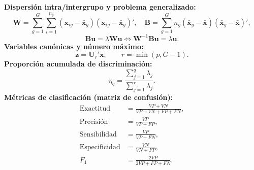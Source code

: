 \documentclass[12pt, a4paper]{article}
\theoremstyle{plain}
\theoremstyle{definition}
\theoremstyle{remark}
\newcommand{\mat}[1]{\mathbf{#1}}
\begin{document}
\begin{mdframed}[style=resultado]
\[\]
\textbf{Dispersión intra/intergrupo y problema generalizado:}
\[
  \mat{W}=\sum_{g=1}^{G}\sum_{i=1}^{n_g}(\mathbf{x}_{ig}-\bar{\mathbf{x}}_g)(\mathbf{x}_{ig}-\bar{\mathbf{x}}_g)',\quad
  \mat{B}=\sum_{g=1}^{G} n_g(\bar{\mathbf{x}}_g-\bar{\mathbf{x}})(\bar{\mathbf{x}}_g-\bar{\mathbf{x}})',
\]
\[
  \mat{B}\mathbf{u}=\lambda\mat{W}\mathbf{u}
  \Longleftrightarrow
  \mat{W}^{-1}\mat{B}\mathbf{u}=\lambda\mathbf{u}.
\]
\textbf{Variables canónicas y número máximo:}
\[
  \mathbf{z}=\mat{U}_r'\mathbf{x},\qquad r=\min(p,G-1).
\]
\textbf{Proporción acumulada de discriminación:}
\[
  \eta_q=\frac{\sum_{j=1}^{q}\lambda_j}{\sum_{j=1}^{r}\lambda_j}.
\]
\textbf{Métricas de clasificación (matriz de confusión):}
\begin{align}
  \text{Exactitud} &= \frac{VP+VN}{VP+VN+FP+FN}, \\
  \text{Precisión} &= \frac{VP}{VP+FP}, \\
  \text{Sensibilidad} &= \frac{VP}{VP+FN}, \\
  \text{Especificidad} &= \frac{VN}{VN+FP}, \\
  F_1 &= \frac{2VP}{2VP+FP+FN}.
\end{align}
\end{mdframed}
\end{document}
